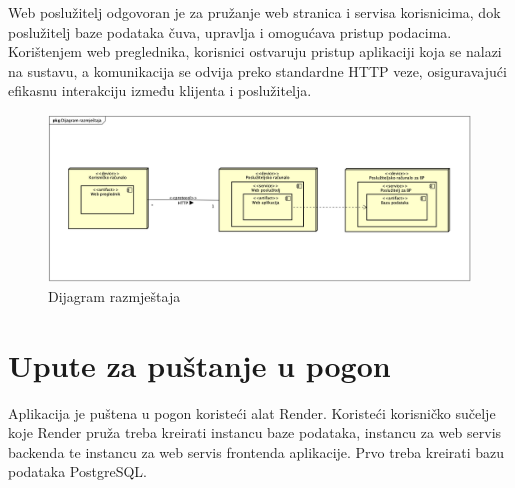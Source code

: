 \begin{enumerate}
			Web poslužitelj odgovoran je za pružanje web stranica i servisa korisnicima, dok poslužitelj baze podataka čuva, upravlja i omogućava pristup podacima. Korištenjem web preglednika, korisnici ostvaruju pristup aplikaciji koja se nalazi na sustavu, a komunikacija se odvija preko standardne HTTP veze, osiguravajući efikasnu interakciju između klijenta i poslužitelja.
			
			\begin{figure}[H]
				\includegraphics[scale=0.35]{dijagrami/dijagram_razmjestaja.png} %
				\centering
				\caption{Dijagram razmještaja}
				\label{fig:promjene}
			\end{figure}
			
			\eject 
		
		\section{Upute za puštanje u pogon}
		
		Aplikacija je puštena u pogon koristeći alat Render. Koristeći korisničko sučelje koje Render pruža treba kreirati instancu baze podataka, instancu za web servis backenda te instancu za web servis frontenda aplikacije. Prvo treba kreirati bazu podataka PostgreSQL.
			

\end{enumerate}
